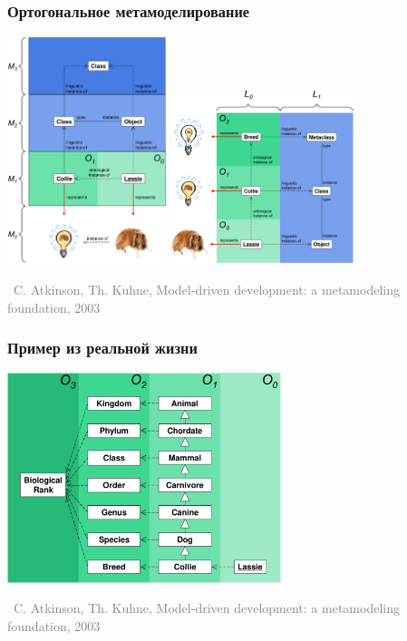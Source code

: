 \documentclass[xetex,mathserif,serif]{beamer}
\newcommand{\attribution}[1] {
\vspace{-5mm}\begin{flushright}\begin{scriptsize}\textcolor{gray}{\textcopyright\, #1}\end{scriptsize}\end{flushright}
}
\begin{document}
	\begin{frame}
		\frametitle{Ортогональное метамоделирование}
		\begin{center}
			\includegraphics[width=0.35\textwidth]{linguisticView.png}
			\hspace{1cm}
			\includegraphics[width=0.4\textwidth]{ontologicalView.png}
			\attribution{C. Atkinson, Th. Kuhne, Model-driven development: a metamodeling foundation, 2003}
		\end{center}
	\end{frame}

	\begin{frame}
		\frametitle{Пример из реальной жизни}
		\begin{center}
			\includegraphics[width=0.6\textwidth]{biologicalClassification.png}
			\attribution{C. Atkinson, Th. Kuhne, Model-driven development: a metamodeling foundation, 2003}
		\end{center}
	\end{frame}
\end{document}
